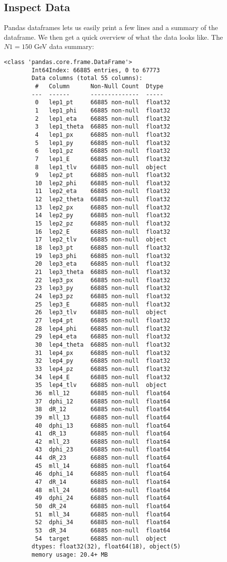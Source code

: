 \documentclass[a4paper, american, 12pt]{report}
\begin{document}
	\subsection{Inspect Data}
	\label{subsect:Method-Inspect Data}
	Pandas dataframes lets us easily print a few lines and a summary of the dataframe. We then get a quick overview of what the data looks like. The $N1=150$ GeV data summary:
	\begin{lstlisting}[caption=Inspect data.,label=InspectData]
		<class 'pandas.core.frame.DataFrame'>
		Int64Index: 66885 entries, 0 to 67773
		Data columns (total 55 columns):
		 #   Column      Non-Null Count  Dtype
		---  ------      --------------  -----
		 0   lep1_pt     66885 non-null  float32
		 1   lep1_phi    66885 non-null  float32
		 2   lep1_eta    66885 non-null  float32
		 3   lep1_theta  66885 non-null  float32
		 4   lep1_px     66885 non-null  float32
		 5   lep1_py     66885 non-null  float32
		 6   lep1_pz     66885 non-null  float32
		 7   lep1_E      66885 non-null  float32
		 8   lep1_tlv    66885 non-null  object
		 9   lep2_pt     66885 non-null  float32
		 10  lep2_phi    66885 non-null  float32
		 11  lep2_eta    66885 non-null  float32
		 12  lep2_theta  66885 non-null  float32
		 13  lep2_px     66885 non-null  float32
		 14  lep2_py     66885 non-null  float32
		 15  lep2_pz     66885 non-null  float32
		 16  lep2_E      66885 non-null  float32
		 17  lep2_tlv    66885 non-null  object
		 18  lep3_pt     66885 non-null  float32
		 19  lep3_phi    66885 non-null  float32
		 20  lep3_eta    66885 non-null  float32
		 21  lep3_theta  66885 non-null  float32
		 22  lep3_px     66885 non-null  float32
		 23  lep3_py     66885 non-null  float32
		 24  lep3_pz     66885 non-null  float32
		 25  lep3_E      66885 non-null  float32
		 26  lep3_tlv    66885 non-null  object
		 27  lep4_pt     66885 non-null  float32
		 28  lep4_phi    66885 non-null  float32
		 29  lep4_eta    66885 non-null  float32
		 30  lep4_theta  66885 non-null  float32
		 31  lep4_px     66885 non-null  float32
		 32  lep4_py     66885 non-null  float32
		 33  lep4_pz     66885 non-null  float32
		 34  lep4_E      66885 non-null  float32
		 35  lep4_tlv    66885 non-null  object
		 36  mll_12      66885 non-null  float64
		 37  dphi_12     66885 non-null  float64
		 38  dR_12       66885 non-null  float64
		 39  mll_13      66885 non-null  float64
		 40  dphi_13     66885 non-null  float64
		 41  dR_13       66885 non-null  float64
		 42  mll_23      66885 non-null  float64
		 43  dphi_23     66885 non-null  float64
		 44  dR_23       66885 non-null  float64
		 45  mll_14      66885 non-null  float64
		 46  dphi_14     66885 non-null  float64
		 47  dR_14       66885 non-null  float64
		 48  mll_24      66885 non-null  float64
		 49  dphi_24     66885 non-null  float64
		 50  dR_24       66885 non-null  float64
		 51  mll_34      66885 non-null  float64
		 52  dphi_34     66885 non-null  float64
		 53  dR_34       66885 non-null  float64
		 54  target      66885 non-null  object
		dtypes: float32(32), float64(18), object(5)
		memory usage: 20.4+ MB
		

\end{lstlisting}
\end{document}
